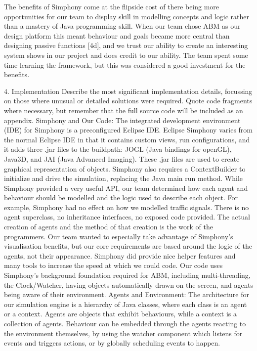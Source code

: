 \documentclass[11pt]{article}
\begin{document}
The benefits of Simphony come at the flipside cost of there being more opportunities for our team to display skill in modelling concepts and logic rather than a mastery of Java programming skill. When our team chose ABM as our design platform this meant behaviour and goals became more central than designing passive functions [4d], and we trust our ability to create an interesting system shows in our project and does credit to our ability. The team spent some time learning the framework, but this was considered a good investment for the benefits.


4. Implementation Describe the most significant implementation details, focussing on those where unusual or detailed solutions were required. Quote code fragments where necessary, but remember that the full source code will be included as an appendix. 
Simphony and Our Code:
The integrated development environment (IDE) for Simphony is a preconfigured Eclipse IDE. Eclipse Simphony varies from the normal Eclipse IDE in that it contains custom views, run configurations, and it adds three .jar files to the buildpath: JOGL (Java bindings for openGL), Java3D, and JAI (Java Advanced Imaging). These .jar files are used to create graphical representation of objects. Simphony also requires a ContextBuilder to initialize and drive the simulation, replacing the Java main run method. 
While Simphony provided a very useful API, our team determined how each agent and behaviour should be modelled and the logic used to describe each object. For example, Simphony had no effect on how we modelled traffic signals. There is no agent superclass, no inheritance interfaces, no exposed code provided. The actual creation of agents and the method of that creation is the work of the programmers. 
Our team wanted to especially take advantage of Simphony’s visualisation benefits, but our core requirements are based around the logic of the agents, not their appearance. Simphony did provide nice helper features and many tools to increase the speed at which we could code. Our code uses Simphony’s background foundation required for ABM, including multi-threading, the Clock/Watcher, having objects automatically drawn on the screen, and agents being aware of their environment.
Agents and Environment:
The architecture for our simulation engine is a hierarchy of Java classes, where each class is an agent or a context. Agents are objects that exhibit behaviours, while a context is a collection of agents. Behaviour can be embedded through the agents reacting to the environment themselves, by using the watcher component which listens for events and triggers actions, or by globally scheduling events to happen.
\end{document}
